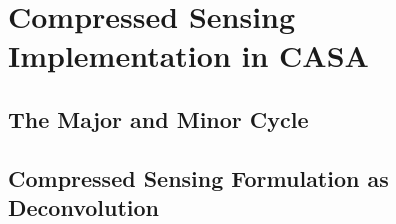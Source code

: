 \section{Compressed Sensing Implementation in CASA}

\subsection{The Major and Minor Cycle}

\subsection{Compressed Sensing Formulation as Deconvolution}


